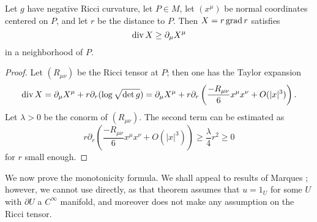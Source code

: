 \begin{lemma}\label{divergence estimate}
Let $g$ have negative Ricci curvature, let $P \in M$, let $(x^\mu)$ be normal coordinates centered on $P$, and let $r$ be the distance to $P$. Then $X = r\operatorname{grad} r$ satisfies
$$\operatorname{div} X \geq \partial_\mu X^\mu$$
in a neighborhood of $P$.
\end{lemma}
\begin{proof}
Let $(R_{\mu\nu})$ be the Ricci tensor at $P$; then one has the Taylor expansion \cite[Lemma 3.4]{schoen1994lectures}
$$\operatorname{div} X = \partial_\mu X^\mu + r\partial_r(\log \sqrt{\det g}) = \partial_\mu X^\mu + r\partial_r\left(\frac{-R_{\mu\nu}}{6}x^\mu x^\nu + O(|x|^3)\right).$$
Let $\lambda > 0$ be the conorm of $(R_{\mu\nu})$. The second term can be estimated as
$$r\partial_r\left(\frac{-R_{\mu\nu}}{6}x^\mu x^\nu + O(|x|^3)\right) \geq \frac{\lambda}{4}r^2 \geq 0$$
for $r$ small enough.
\end{proof}

We now prove the monotonicity formula. We shall appeal to results of Marques \cite{MarquesXX}; however, we cannot use \cite[Theorem 7.11]{MarquesXX} directly, as that theorem assumes that $u = 1_U$ for some $U$ with $\partial U$ a $C^\infty$ manifold, and moreover does not make any assumption on the Ricci tensor.

